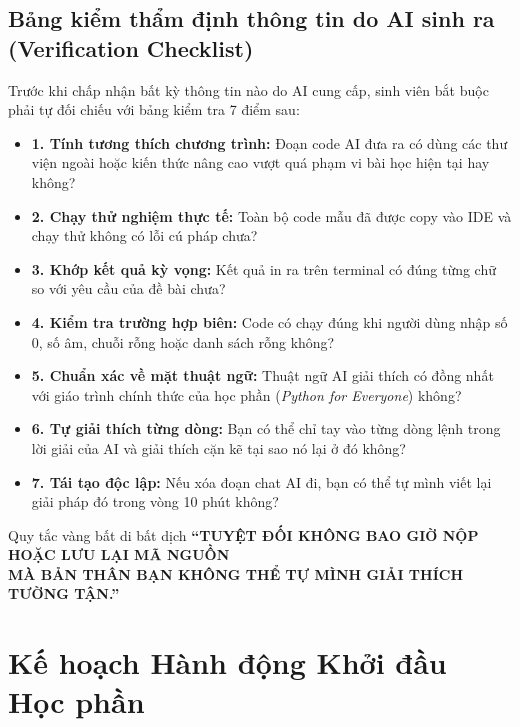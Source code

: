 \documentclass[11pt,a4paper]{article}
\begin{document}
\subsection{Bảng kiểm thẩm định thông tin do AI sinh ra (Verification Checklist)}
Trước khi chấp nhận bất kỳ thông tin nào do AI cung cấp, sinh viên bắt buộc phải tự đối chiếu với bảng kiểm tra 7 điểm sau:
\begin{itemize}[leftmargin=1.5em, itemsep=2pt]
    \item[$\square$] \textbf{1. Tính tương thích chương trình:} Đoạn code AI đưa ra có dùng các thư viện ngoài hoặc kiến thức nâng cao vượt quá phạm vi bài học hiện tại hay không?
    \item[$\square$] \textbf{2. Chạy thử nghiệm thực tế:} Toàn bộ code mẫu đã được copy vào IDE và chạy thử không có lỗi cú pháp chưa?
    \item[$\square$] \textbf{3. Khớp kết quả kỳ vọng:} Kết quả in ra trên terminal có đúng từng chữ so với yêu cầu của đề bài chưa?
    \item[$\square$] \textbf{4. Kiểm tra trường hợp biên:} Code có chạy đúng khi người dùng nhập số 0, số âm, chuỗi rỗng hoặc danh sách rỗng không?
    \item[$\square$] \textbf{5. Chuẩn xác về mặt thuật ngữ:} Thuật ngữ AI giải thích có đồng nhất với giáo trình chính thức của học phần (\textit{Python for Everyone}) không?
    \item[$\square$] \textbf{6. Tự giải thích từng dòng:} Bạn có thể chỉ tay vào từng dòng lệnh trong lời giải của AI và giải thích cặn kẽ tại sao nó lại ở đó không?
    \item[$\square$] \textbf{7. Tái tạo độc lập:} Nếu xóa đoạn chat AI đi, bạn có thể tự mình viết lại giải pháp đó trong vòng 10 phút không?
\end{itemize}

\vspace{3mm}

\begin{warningbox}{Quy tắc vàng bất di bất dịch}
\centering
\Large\textbf{``TUYỆT ĐỐI KHÔNG BAO GIỜ NỘP HOẶC LƯU LẠI MÃ NGUỒN\\[2mm]MÀ BẢN THÂN BẠN KHÔNG THỂ TỰ MÌNH GIẢI THÍCH TƯỜNG TẬN.''}
\end{warningbox}

\vspace{4mm}
\section{Kế hoạch Hành động Khởi đầu Học phần}
\end{document}
